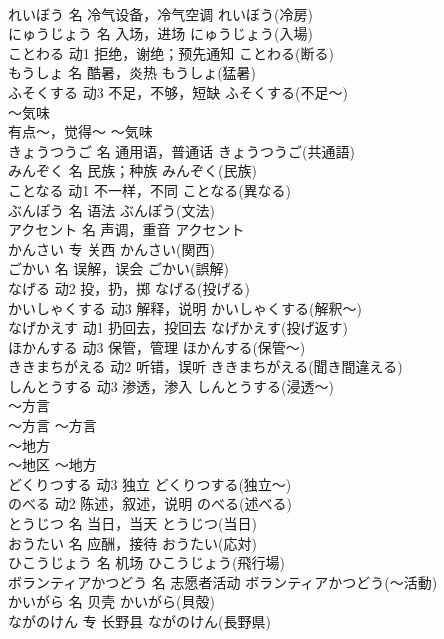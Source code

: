\documentclass[8pt]{extreport}
\begin{document}
\begin{CJK}{UTF8}{min}
\\	れいぼう	名	冷气设备，冷气空调	れいぼう(冷房)	
\\	にゅうじょう	名	入场，进场	にゅうじょう(入場)	
\\	ことわる	动1	拒绝，谢绝；预先通知	ことわる(断る)	
\\	もうしょ	名	酷暑，炎热	もうしょ(猛暑)	
\\	ふそくする	动3	不足，不够，短缺	ふそくする(不足～)	
\\	～気味	
\\	有点～，觉得～	～気味	
\\	きょうつうご	名	通用语，普通话	きょうつうご(共通語)	
\\	みんぞく	名	民族；种族	みんぞく(民族)	
\\	ことなる	动1	不一样，不同	ことなる(異なる)	
\\	ぶんぽう	名	语法	ぶんぽう(文法)	
\\	アクセント	名	声调，重音	アクセント	
\\	かんさい	专	关西	かんさい(関西)	
\\	ごかい	名	误解，误会	ごかい(誤解)	
\\	なげる	动2	投，扔，掷	なげる(投げる)	
\\	かいしゃくする	动3	解释，说明	かいしゃくする(解釈～)	
\\	なげかえす	动1	扔回去，投回去	なげかえす(投げ返す)	
\\	ほかんする	动3	保管，管理	ほかんする(保管～)	
\\	ききまちがえる	动2	听错，误听	ききまちがえる(聞き間違える)	
\\	しんとうする	动3	渗透，渗入	しんとうする(浸透～)	
\\	～方言	
\\	～方言	～方言	
\\	～地方	
\\	～地区	～地方	
\\	どくりつする	动3	独立	どくりつする(独立～)	
\\	のべる	动2	陈述，叙述，说明	のべる(述べる)	
\\	とうじつ	名	当日，当天	とうじつ(当日)	
\\	おうたい	名	应酬，接待	おうたい(応対)	
\\	ひこうじょう	名	机场	ひこうじょう(飛行場)	
\\	ボランティアかつどう	名	志愿者活动	ボランティアかつどう(～活動)	
\\	かいがら	名	贝壳	かいがら(貝殻)	
\\	ながのけん	专	长野县	ながのけん(長野県)	

\end{CJK}
\end{document}
